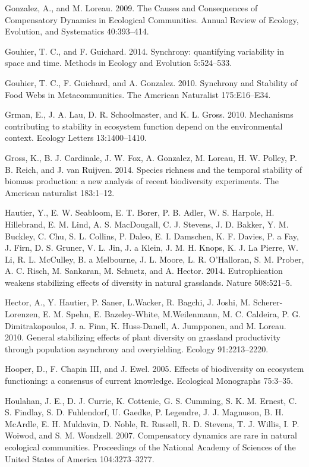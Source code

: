 \documentclass[12pt,]{article}
\begin{document}
Gonzalez, A., and M. Loreau. 2009. The Causes and Consequences of
Compensatory Dynamics in Ecological Communities. Annual Review of
Ecology, Evolution, and Systematics 40:393--414.

Gouhier, T. C., and F. Guichard. 2014. Synchrony: quantifying
variability in space and time. Methods in Ecology and Evolution
5:524--533.

Gouhier, T. C., F. Guichard, and A. Gonzalez. 2010. Synchrony and
Stability of Food Webs in Metacommunities. The American Naturalist
175:E16--E34.

Grman, E., J. A. Lau, D. R. Schoolmaster, and K. L. Gross. 2010.
Mechanisms contributing to stability in ecosystem function depend on the
environmental context. Ecology Letters 13:1400--1410.

Gross, K., B. J. Cardinale, J. W. Fox, A. Gonzalez, M. Loreau, H. W.
Polley, P. B. Reich, and J. van Ruijven. 2014. Species richness and the
temporal stability of biomass production: a new analysis of recent
biodiversity experiments. The American naturalist 183:1--12.

Hautier, Y., E. W. Seabloom, E. T. Borer, P. B. Adler, W. S. Harpole, H.
Hillebrand, E. M. Lind, A. S. MacDougall, C. J. Stevens, J. D. Bakker,
Y. M. Buckley, C. Chu, S. L. Collins, P. Daleo, E. I. Damschen, K. F.
Davies, P. a Fay, J. Firn, D. S. Gruner, V. L. Jin, J. a Klein, J. M. H.
Knops, K. J. {La Pierre}, W. Li, R. L. McCulley, B. a Melbourne, J. L.
Moore, L. R. O'Halloran, S. M. Prober, A. C. Risch, M. Sankaran, M.
Schuetz, and A. Hector. 2014. Eutrophication weakens stabilizing effects
of diversity in natural grasslands. Nature 508:521--5.

Hector, A., Y. Hautier, P. Saner, L.Wacker, R. Bagchi, J. Joshi, M.
Scherer-Lorenzen, E. M. Spehn, E. Bazeley-White, M.Weilenmann, M. C.
Caldeira, P. G. Dimitrakopoulos, J. a. Finn, K. Huss-Danell, A.
Jumpponen, and M. Loreau. 2010. General stabilizing effects of plant
diversity on grassland productivity through population asynchrony and
overyielding. Ecology 91:2213--2220.

Hooper, D., F. {Chapin III}, and J. Ewel. 2005. Effects of biodiversity
on ecosystem functioning: a consensus of current knowledge. Ecological
Monographs 75:3--35.

Houlahan, J. E., D. J. Currie, K. Cottenie, G. S. Cumming, S. K. M.
Ernest, C. S. Findlay, S. D. Fuhlendorf, U. Gaedke, P. Legendre, J. J.
Magnuson, B. H. McArdle, E. H. Muldavin, D. Noble, R. Russell, R. D.
Stevens, T. J. Willis, I. P. Woiwod, and S. M. Wondzell. 2007.
Compensatory dynamics are rare in natural ecological communities.
Proceedings of the National Academy of Sciences of the United States of
America 104:3273--3277.
\end{document}
